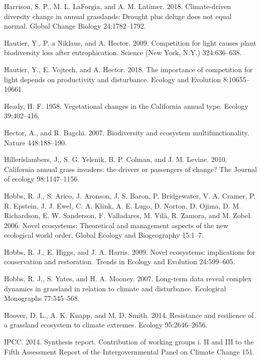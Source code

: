 \documentclass[twoside,12pt,final]{ucthesis-CA2012}
\begin{document}
\begin{ucmainmatter}
\leavevmode\hypertarget{ref-Harrison2018}{}%
Harrison, S. P., M. L. LaForgia, and A. M. Latimer. 2018. Climate-driven diversity change in annual grasslands: Drought plus deluge does not equal normal. Global Change Biology 24:1782--1792.

\leavevmode\hypertarget{ref-Hautier2009}{}%
Hautier, Y., P. a Niklaus, and A. Hector. 2009. Competition for light causes plant biodiversity loss after eutrophication. Science (New York, N.Y.) 324:636--638.

\leavevmode\hypertarget{ref-Hautier2018}{}%
Hautier, Y., E. Vojtech, and A. Hector. 2018. The importance of competition for light depends on productivity and disturbance. Ecology and Evolution 8:10655--10661.

\leavevmode\hypertarget{ref-Heady1958}{}%
Heady, H. F. 1958. Vegetational changes in the California annual type. Ecology 39:402--416.

\leavevmode\hypertarget{ref-Hector2007}{}%
Hector, A., and R. Bagchi. 2007. Biodiversity and ecosystem multifunctionality. Nature 448:188--190.

\leavevmode\hypertarget{ref-Hillerislambers2010}{}%
Hillerislambers, J., S. G. Yelenik, B. P. Colman, and J. M. Levine. 2010. California annual grass invaders: the drivers or passengers of change? The Journal of ecology 98:1147--1156.

\leavevmode\hypertarget{ref-Hobbs2006}{}%
Hobbs, R. J., S. Arico, J. Aronson, J. S. Baron, P. Bridgewater, V. A. Cramer, P. R. Epstein, J. J. Ewel, C. A. Klink, A. E. Lugo, D. Norton, D. Ojima, D. M. Richardson, E. W. Sanderson, F. Valladares, M. Vilà, R. Zamora, and M. Zobel. 2006. Novel ecosystems: Theoretical and management aspects of the new ecological world order. Global Ecology and Biogeography 15:1--7.

\leavevmode\hypertarget{ref-Hobbs2009}{}%
Hobbs, R. J., E. Higgs, and J. A. Harris. 2009. Novel ecosystems: implications for conservation and restoration. Trends in Ecology and Evolution 24:599--605.

\leavevmode\hypertarget{ref-Hobbs2007}{}%
Hobbs, R. J., S. Yates, and H. A. Mooney. 2007. Long-term data reveal complex dynamics in grassland in relation to climate and disturbance. Ecological Monographs 77:545--568.

\leavevmode\hypertarget{ref-Hoover2014}{}%
Hoover, D. L., A. K. Knapp, and M. D. Smith. 2014. Resistance and resilience of a grassland ecosystem to climate extremes. Ecology 95:2646--2656.

\leavevmode\hypertarget{ref-IPCC2014}{}%
IPCC. 2014. Synthesis report. Contribution of working groups i. II and III to the Fifth Assessment Report of the Intergovernmental Panel on Climate Change 151.


\end{ucmainmatter}
\end{document}
